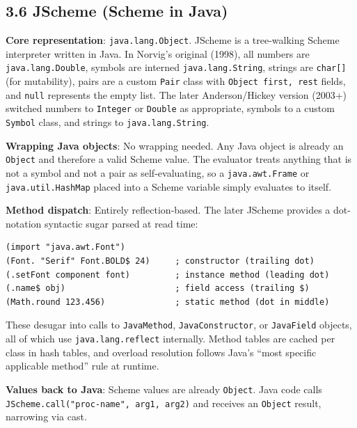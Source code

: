 \documentclass[
  12pt,
]{report}
\newcommand{\passthrough}[1]{#1}
\begin{document}
\subsection{3.6 JScheme (Scheme in Java)}\label{jscheme-scheme-in-java}

\textbf{Core representation}:
\passthrough{\lstinline!java.lang.Object!}. JScheme is a tree-walking
Scheme interpreter written in Java. In Norvig's original (1998), all
numbers are \passthrough{\lstinline!java.lang.Double!}, symbols are
interned \passthrough{\lstinline!java.lang.String!}, strings are
\passthrough{\lstinline!char[]!} (for mutability), pairs are a custom
\passthrough{\lstinline!Pair!} class with
\passthrough{\lstinline!Object first, rest!} fields, and
\passthrough{\lstinline!null!} represents the empty list. The later
Anderson/Hickey version (2003+) switched numbers to
\passthrough{\lstinline!Integer!} or \passthrough{\lstinline!Double!} as
appropriate, symbols to a custom \passthrough{\lstinline!Symbol!} class,
and strings to \passthrough{\lstinline!java.lang.String!}.

\textbf{Wrapping Java objects}: No wrapping needed. Any Java object is
already an \passthrough{\lstinline!Object!} and therefore a valid Scheme
value. The evaluator treats anything that is not a symbol and not a pair
as self-evaluating, so a \passthrough{\lstinline!java.awt.Frame!} or
\passthrough{\lstinline!java.util.HashMap!} placed into a Scheme
variable simply evaluates to itself.

\textbf{Method dispatch}: Entirely reflection-based. The later JScheme
provides a dot-notation syntactic sugar parsed at read time:

\begin{lstlisting}
(import "java.awt.Font")
(Font. "Serif" Font.BOLD$ 24)     ; constructor (trailing dot)
(.setFont component font)         ; instance method (leading dot)
(.name$ obj)                      ; field access (trailing $)
(Math.round 123.456)              ; static method (dot in middle)
\end{lstlisting}

These desugar into calls to \passthrough{\lstinline!JavaMethod!},
\passthrough{\lstinline!JavaConstructor!}, or
\passthrough{\lstinline!JavaField!} objects, all of which use
\passthrough{\lstinline!java.lang.reflect!} internally. Method tables
are cached per class in hash tables, and overload resolution follows
Java's ``most specific applicable method'' rule at runtime.

\textbf{Values back to Java}: Scheme values are already
\passthrough{\lstinline!Object!}. Java code calls
\passthrough{\lstinline!JScheme.call("proc-name", arg1, arg2)!} and
receives an \passthrough{\lstinline!Object!} result, narrowing via cast.
\end{document}
